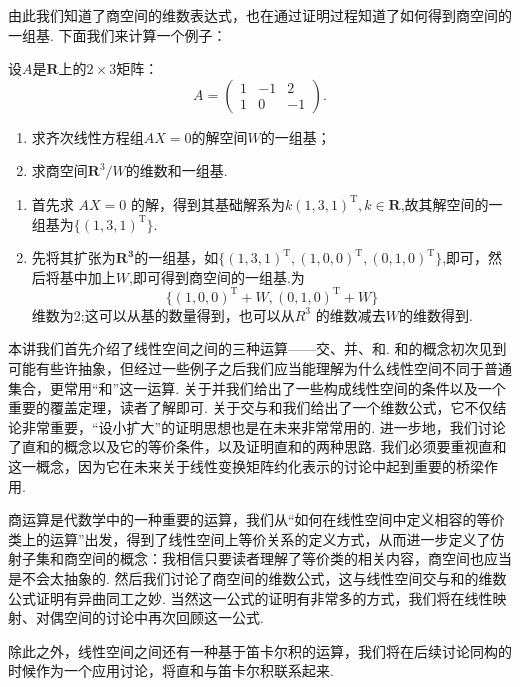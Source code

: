 由此我们知道了商空间的维数表达式，也在通过证明过程知道了如何得到商空间的一组基. 下面我们来计算一个例子：

\begin{example}{}{}
    设$A$是$\mathbf{R}$上的$2\times 3$矩阵：
    \[A=\begin{pmatrix}
            1 & -1 & 2 \\ 1 & 0 & -1
        \end{pmatrix}.\]
    \begin{enumerate}
        \item 求齐次线性方程组$AX=0$的解空间$W$的一组基；

        \item 求商空间$\mathbf{R}^3/W$的维数和一组基.
    \end{enumerate}
\end{example}

\begin{solution}
    \begin{enumerate}
        \item 首先求 $AX=0$ 的解，得到其基础解系为$k(1,3,1)^{\mathrm{T}},k \in \mathbf{R}$,故其解空间的一组基为$\{(1,3,1)^{\mathrm{T}}\}$.
        \item 先将其扩张为$\mathbf{R^3}$的一组基，如$\{(1,3,1)^{\mathrm{T}},(1,0,0)^{\mathrm{T}},(0,1,0)^{\mathrm{T}}\}$,即可，然后将基中加上$W$,即可得到商空间的一组基.为
        \[
            \{(1,0,0)^{\mathrm{T}}+W,(0,1,0)^{\mathrm{T}}+W\}
        \]
        维数为2;这可以从基的数量得到，也可以从$R^3$ 的维数减去$W$的维数得到.

    \end{enumerate}
\end{solution}

\begin{summary}

    本讲我们首先介绍了线性空间之间的三种运算——交、并、和. 和的概念初次见到可能有些许抽象，但经过一些例子之后我们应当能理解为什么线性空间不同于普通集合，更常用``和''这一运算. 关于并我们给出了一些构成线性空间的条件以及一个重要的覆盖定理，读者了解即可. 关于交与和我们给出了一个维数公式，它不仅结论非常重要，``设小扩大''的证明思想也是在未来非常常用的. 进一步地，我们讨论了直和的概念以及它的等价条件，以及证明直和的两种思路. 我们必须要重视直和这一概念，因为它在未来关于线性变换矩阵约化表示的讨论中起到重要的桥梁作用.

    商运算是代数学中的一种重要的运算，我们从``如何在线性空间中定义相容的等价类上的运算''出发，得到了线性空间上等价关系的定义方式，从而进一步定义了仿射子集和商空间的概念：我相信只要读者理解了等价类的相关内容，商空间也应当是不会太抽象的. 然后我们讨论了商空间的维数公式，这与线性空间交与和的维数公式证明有异曲同工之妙. 当然这一公式的证明有非常多的方式，我们将在线性映射、对偶空间的讨论中再次回顾这一公式.

    除此之外，线性空间之间还有一种基于笛卡尔积的运算，我们将在后续讨论同构的时候作为一个应用讨论，将直和与笛卡尔积联系起来.

\end{summary}

